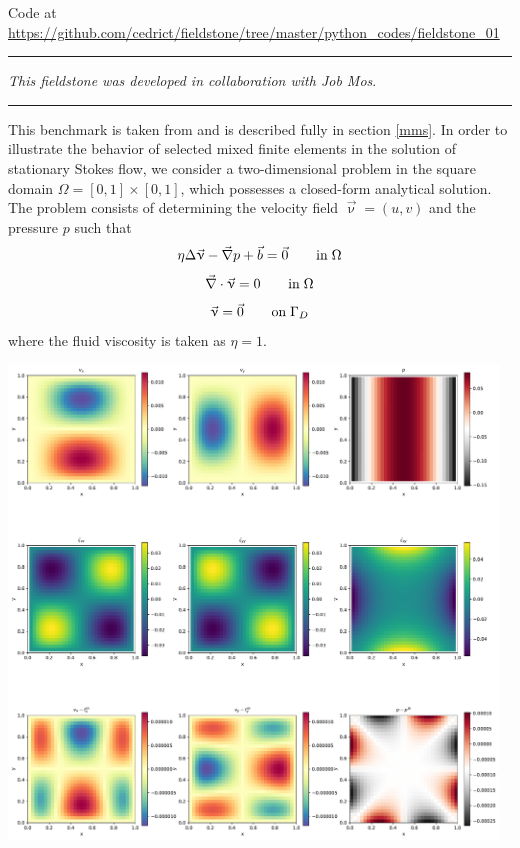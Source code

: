 

\begin{center}
Code at \url{https://github.com/cedrict/fieldstone/tree/master/python_codes/fieldstone_01}
\end{center}

\par\noindent\rule{\textwidth}{0.4pt}

{\sl This fieldstone was developed in collaboration with Job Mos}. 

\par\noindent\rule{\textwidth}{0.4pt}

This benchmark is taken from \cite{dohu03} and is described fully in section \ref{mms}. 
In order to illustrate the behavior of selected mixed finite elements in the solution 
of stationary Stokes flow,  we consider a two-dimensional problem 
in the square domain $\Omega=[0,1]\times[0,1]$, which possesses a closed-form analytical 
solution. The problem consists of determining the velocity field $\vec{\upnu} = (u,v)$ and the 
pressure $p$ such that 
\[
\eta \Delta \vec\upnu - \vec{\nabla} p + \vec{b} = \vec{0}   \quad\quad {\rm in} \; \Omega
\]
\[
\vec{\nabla} \cdot \vec{\upnu} = 0 \quad\quad {\rm in} \; \Omega
\]
\[
\vec{\upnu}=\vec{0} \quad\quad {\rm on} \; \Gamma_D
\]
where the fluid viscosity is taken as $\eta=1$. 

\begin{center}
\includegraphics[width=13cm]{python_codes/fieldstone_01/solution.pdf}
\end{center}

